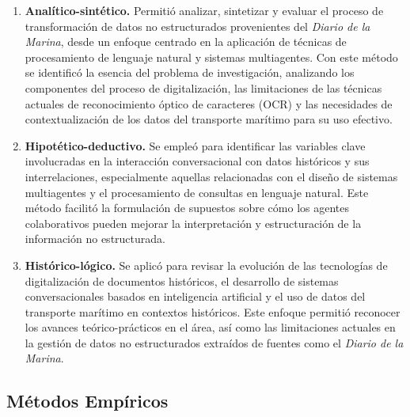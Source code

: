 	\begin{enumerate}
		\item \textbf{Analítico-sintético.} Permitió analizar, sintetizar y evaluar el proceso de transformación de datos no estructurados provenientes del \textit{Diario de la Marina}, desde un enfoque centrado en la aplicación de técnicas de procesamiento de lenguaje natural y sistemas multiagentes. Con este método se identificó la esencia del problema de investigación, analizando los componentes del proceso de digitalización, las limitaciones de las técnicas actuales de reconocimiento óptico de caracteres (OCR) y las necesidades de contextualización de los datos del transporte marítimo para su uso efectivo.
		
		\item \textbf{Hipotético-deductivo.} Se empleó para identificar las variables clave involucradas en la interacción conversacional con datos históricos y sus interrelaciones, especialmente aquellas relacionadas con el diseño de sistemas multiagentes y el procesamiento de consultas en lenguaje natural. Este método facilitó la formulación de supuestos sobre cómo los agentes colaborativos pueden mejorar la interpretación y estructuración de la información no estructurada.
		
		\item \textbf{Histórico-lógico.} Se aplicó para revisar la evolución de las tecnologías de digitalización de documentos históricos, el desarrollo de sistemas conversacionales basados en inteligencia artificial y el uso de datos del transporte marítimo en contextos históricos. Este enfoque permitió reconocer los avances teórico-prácticos en el área, así como las limitaciones actuales en la gestión de datos no estructurados extraídos de fuentes como el \textit{Diario de la Marina}.
	\end{enumerate}
	
	\subsection*{Métodos Empíricos}
	
